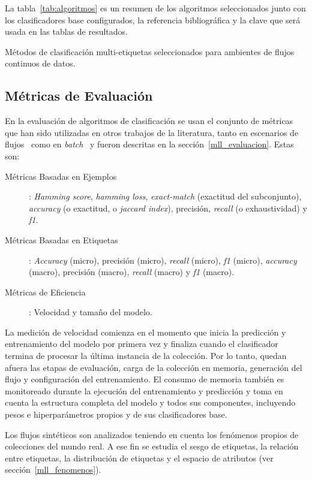 La tabla~\ref{tab:algoritmos} es un resumen de los algoritmos seleccionados
junto con los clasificadores base configurados, la referencia bibliográfica y la
clave que será usada en las tablas de resultados.

\begin{table}[htbp]
	\centering
	\begin{adjustbox}{max width=\textwidth}
		
	\end{adjustbox}
	\caption{Métodos de clasificación multi-etiquetas seleccionados para ambientes
		de flujos continuos de datos.}
	\label{tab:algoritmos}
\end{table}

\subsection{Métricas de Evaluación}

En la evaluación de algoritmos de clasificación se usan el conjunto de métricas
que han sido utilizadas en otros trabajos de la literatura, tanto en escenarios
de
flujos~\cite{sousa_multi-label_2018,zheng_survey_2020,osojnik_multi-label_2017}
como en
\textit{batch}~\cite{madjarov_extensive_2012,zhang_multi-label_2010,gibaja_tutorial_2015}
y fueron descritas en la sección~\ref{mll_evaluacion}.  Estas son:

\begin{description}

	\item[Métricas Basadas en Ejemplos]: \textit{Hamming score}, \textit{hamming
		      loss}, \textit{exact-match} (exactitud del subconjunto),
	      \textit{accuracy} (o exactitud, o \textit{jaccard index}), precisión,
	      \textit{recall} (o exhaustividad) y \textit{f1}.

	\item[Métricas Basadas en Etiquetas]: \textit{Accuracy} (micro), precisión
	      (micro), \textit{recall} (micro), \textit{f1} (micro),
	      \textit{accuracy} (macro), precisión (macro), \textit{recall} (macro)
	      y \textit{f1} (macro).

	\item[Métricas de Eficiencia]: Velocidad y tamaño del modelo.

\end{description}

La medición de velocidad comienza en el momento que inicia la predicción y
entrenamiento del modelo por primera vez y finaliza cuando el clasificador
termina de procesar la última instancia de la colección. Por lo tanto, quedan
afuera las etapas de evaluación, carga de la colección en memoria, generación
del flujo y configuración del entrenamiento. El consumo de memoria también es
monitoreado durante la ejecución del entrenamiento y predicción y toma en cuenta
la estructura completa del modelo y todos sus componentes, incluyendo pesos e
hiperparámetros propios y de sus clasificadores base.

Los flujos sintéticos son analizados teniendo en cuenta los fenómenos propios de
colecciones del mundo real. A ese fin se estudia el sesgo de etiquetas, la
relación entre etiquetas, la distribución de etiquetas y el espacio de atributos
(ver sección~\ref{mll_fenomenos}).
